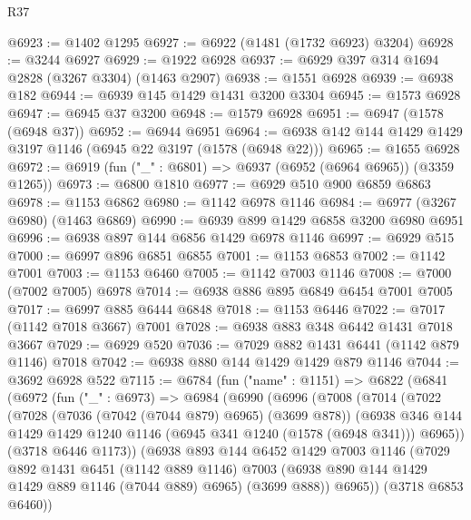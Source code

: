 \begin{lexlean}{R37}
\begin{coremodule}
@6923 := @1402 @1295
@6927 := @6922 (@1481 (@1732 @6923) @3204)
@6928 := @3244 @6927
@6929 := @1922 @6928
@6937 := @6929 @397 @314 @1694 @2828 (@3267 @3304) (@1463 @2907)
@6938 := @1551 @6928
@6939 := @6938 @182
@6944 := @6939 @145 @1429 @1431 @3200 @3304
@6945 := @1573 @6928
@6947 := @6945 @37 @3200
@6948 := @1579 @6928
@6951 := @6947 (@1578 (@6948 @37))
@6952 := @6944 @6951
@6964 := @6938 @142 @144 @1429 @1429 @3197 @1146 (@6945 @22 @3197 (@1578 (@6948 @22)))
@6965 := @1655 @6928
@6972 := @6919 (fun ("_" : @6801) => @6937 (@6952 (@6964 @6965)) (@3359 @1265))
@6973 := @6800 @1810
@6977 := @6929 @510 @900 @6859 @6863
@6978 := @1153 @6862
@6980 := @1142 @6978 @1146
@6984 := @6977 (@3267 @6980) (@1463 @6869)
@6990 := @6939 @899 @1429 @6858 @3200 @6980 @6951
@6996 := @6938 @897 @144 @6856 @1429 @6978 @1146
@6997 := @6929 @515
@7000 := @6997 @896 @6851 @6855
@7001 := @1153 @6853
@7002 := @1142 @7001
@7003 := @1153 @6460
@7005 := @1142 @7003 @1146
@7008 := @7000 (@7002 @7005) @6978
@7014 := @6938 @886 @895 @6849 @6454 @7001 @7005
@7017 := @6997 @885 @6444 @6848
@7018 := @1153 @6446
@7022 := @7017 (@1142 @7018 @3667) @7001
@7028 := @6938 @883 @348 @6442 @1431 @7018 @3667
@7029 := @6929 @520
@7036 := @7029 @882 @1431 @6441 (@1142 @879 @1146) @7018
@7042 := @6938 @880 @144 @1429 @1429 @879 @1146
@7044 := @3692 @6928 @522
@7115 := @6784
    (fun ("name" : @1151) =>
    @6822
      (@6841
        (@6972
          (fun ("_" : @6973) =>
          @6984
            (@6990
              (@6996
                (@7008
                  (@7014
                    (@7022
                      (@7028
                        (@7036 (@7042 (@7044 @879) @6965) (@3699 @878))
                        (@6938
                          @346
                          @144
                          @1429
                          @1429
                          @1240
                          @1146
                          (@6945 @341 @1240 (@1578 (@6948 @341)))
                          @6965))
                      (@3718 @6446 @1173))
                    (@6938
                      @893
                      @144
                      @6452
                      @1429
                      @7003
                      @1146
                      (@7029
                        @892
                        @1431
                        @6451
                        (@1142 @889 @1146)
                        @7003
                        (@6938 @890 @144 @1429 @1429 @889 @1146 (@7044 @889) @6965)
                        (@3699 @888))
                      @6965))
                  (@3718 @6853 @6460))

\end{coremodule}
\end{lexlean}
